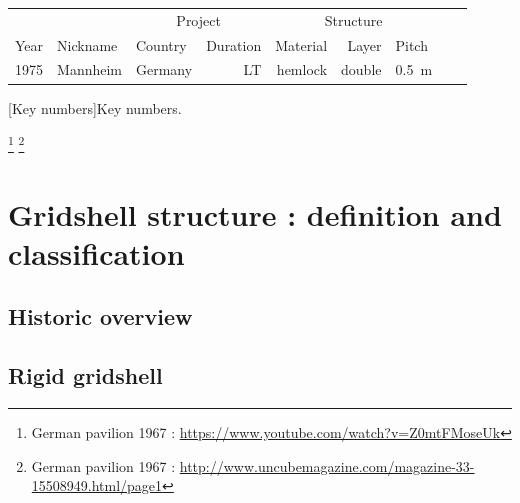 \begin{landscape}%
\begin{table}[p]
\centering
{}
 	\begin{tabularx}{20cm}{@{}lll rrrXXX@{}}
	\toprule
		&			& \multicolumn{2}{c}{Project} 			& \multicolumn{3}{c}{Structure}	 	\\
	\cmidrule(l){3-4} \cmidrule(l){5-7}
 	Year & Nickname 	& Country		& Duration			& Material 	& Layer	& Pitch		\\ 
	\midrule
	1975	& Mannheim	& Germany	& LT					& hemlock	 	& double	& \SI{0.5}{m}	\\	
	\bottomrule
 	\end{tabularx}
[Key numbers]{Key numbers.}
\end{table}
\end{landscape}%




\clearpage

\footnote{German pavilion 1967 : \url{https://www.youtube.com/watch?v=Z0mtFMoseUk}}
\footnote{German pavilion 1967 : \url{http://www.uncubemagazine.com/magazine-33-15508949.html/page1}}





\section{Gridshell structure : definition and classification}
\subsection{Historic overview}
\subsection{Rigid gridshell}



